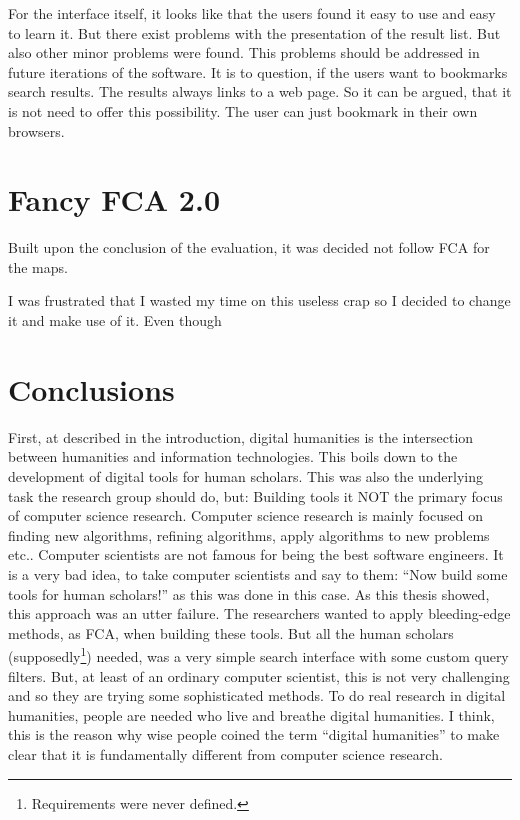 \documentclass[11pt]{report}
\begin{document}
For the interface itself, it looks like that the users found it easy to use and easy to learn it. But there exist problems with the presentation of the result list. But also other minor problems were found. This problems should be addressed in future iterations of the software. It is to question, if the users want to bookmarks search results. The results always links to a web page. So it can be argued, that it is not need to offer this possibility. The user can just bookmark in their own browsers.

\chapter{Fancy FCA 2.0}
\label{Fancy 2.0}

Built upon the conclusion of the evaluation, it was decided not follow FCA for the maps. 

I was frustrated that I wasted my time on this useless crap so I decided to change it and make use of it. Even though

\chapter{Conclusions}
\label{Conclusions}

First, at described in the introduction, digital humanities is the intersection between humanities and information technologies. This boils down to the development of digital tools for human scholars. This was also the underlying task the research group should do, but: Building tools it NOT the primary focus of computer science research. Computer science research is mainly focused on finding new algorithms, refining algorithms, apply algorithms to new problems etc.. Computer scientists are not famous for being the best software engineers. It is a very bad idea, to take computer scientists and say to them: ``Now build some tools for human scholars!'' as this was done in this case. As this thesis showed, this approach was an utter failure. The researchers wanted to apply bleeding-edge methods, as FCA, when building these tools. But all the human scholars (supposedly\footnote{Requirements were never defined.}) needed, was a very simple search interface with some custom query filters. But, at least of an ordinary computer scientist, this is not very challenging and so they are trying some sophisticated methods. To do real research in digital humanities, people are needed who live and breathe digital humanities. I think, this is the reason why wise people coined the term ``digital humanities'' to make clear that it is fundamentally different from computer science research. \\
\end{document}
